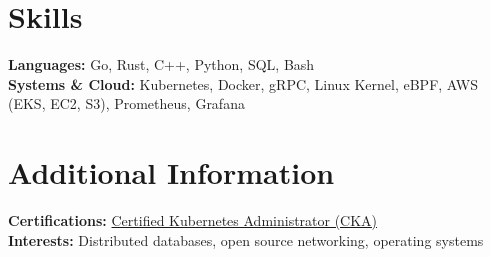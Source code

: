 \documentclass[10pt]{article}
\begin{document}
\section{Skills}
\noindent\textbf{Languages:} Go, Rust, C++, Python, SQL, Bash\\
\textbf{Systems \& Cloud:} Kubernetes, Docker, gRPC, Linux Kernel, eBPF, AWS (EKS, EC2, S3), Prometheus, Grafana
\section{Additional Information}
\noindent\textbf{Certifications:} \href{https://example.com/cka}{Certified Kubernetes Administrator (CKA)}\\
\textbf{Interests:} Distributed databases, open source networking, operating systems
\end{document}
